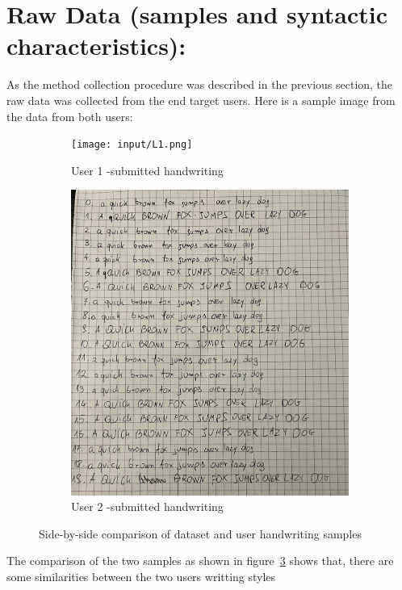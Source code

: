 \documentclass[twoside,a4paper]{article}
\begin{document}
\section{Raw Data (samples and syntactic characteristics): }
As the method collection procedure was described in the previous section, the raw data was collected from the end target users.
Here is a sample image from the data from both users:
\begin{figure}[H]
  \centering

  \begin{subfigure}[b]{0.45\textwidth}
    \centering
    \texttt{[image: input/L1.png]}
    \caption{User 1 -submitted handwriting }
    \label{fig:l1_sample}
  \end{subfigure}
  \hfill
  \begin{subfigure}[b]{0.45\textwidth}
    \centering
    \includegraphics[width=\textwidth]{input/K1.jpg}
    \caption{User 2 -submitted handwriting }
    \label{fig:kuba_sample}
  \end{subfigure}

  \caption{Side-by-side comparison of dataset and user handwriting samples}
  \label{fig:raw_data_sample}
\end{figure}
The comparison of the two samples as shown in figure~\ref{fig:raw_data_sample} shows that, there are some similarities between the two users writting styles
\end{document}

